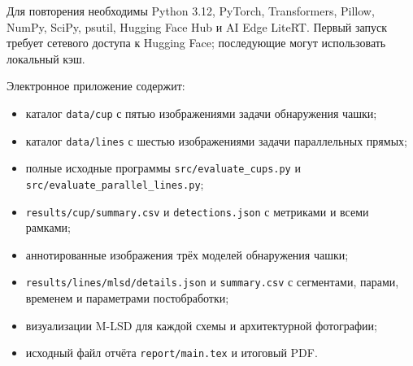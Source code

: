 \documentclass[a4paper,12pt]{extreport}
\newcommand{\code}[1]{\nolinkurl{#1}}
\begin{document}
Для повторения необходимы Python 3.12, PyTorch, Transformers, Pillow, NumPy, SciPy, psutil, Hugging Face Hub и AI Edge LiteRT. Первый запуск требует сетевого доступа к Hugging Face; последующие могут использовать локальный кэш.

Электронное приложение содержит:
\begin{itemize}
\item каталог \code{data/cup} с пятью изображениями задачи обнаружения чашки;
\item каталог \code{data/lines} с шестью изображениями задачи параллельных прямых;
\item полные исходные программы \code{src/evaluate_cups.py} и \code{src/evaluate_parallel_lines.py};
\item \code{results/cup/summary.csv} и \code{detections.json} с метриками и всеми рамками;
\item аннотированные изображения трёх моделей обнаружения чашки;
\item \code{results/lines/mlsd/details.json} и \code{summary.csv} с сегментами, парами, временем и параметрами постобработки;
\item визуализации M-LSD для каждой схемы и архитектурной фотографии;
\item исходный файл отчёта \code{report/main.tex} и итоговый PDF.
\end{itemize}
\end{document}

